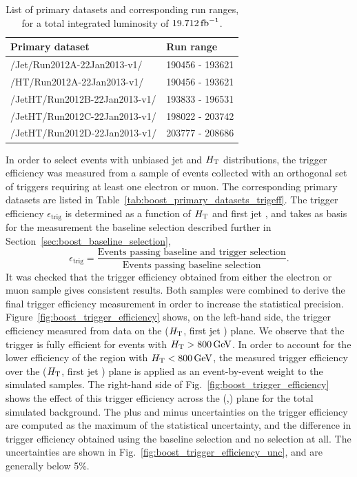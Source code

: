 \begin{table}[htdp]
\caption{List of primary datasets and corresponding run ranges, for a total integrated luminosity
of $19.712 \mbox{\ensuremath{\,\text{fb}^\text{$-$1}}}$.}
\begin{center}
\begin{tabular}{ l l }
\toprule
Primary dataset & Run range \\
\midrule
/Jet/Run2012A-22Jan2013-v1/ & 190456 - 193621 \\
/HT/Run2012A-22Jan2013-v1/  & 190456 - 193621 \\
/JetHT/Run2012B-22Jan2013-v1/ & 193833 - 196531 \\
/JetHT/Run2012C-22Jan2013-v1/ & 198022 - 203742 \\
/JetHT/Run2012D-22Jan2013-v1/ & 203777 - 208686  \\
\bottomrule
\end{tabular}
\end{center}
\label{tab:boost_primary_datasets}
\end{table}


In order to select events with unbiased jet \pt and $H_{\mathrm{T}}$ distributions,
the trigger efficiency was measured from a sample of events collected with an orthogonal set of
triggers requiring at least one electron or muon. The corresponding primary datasets are listed in
Table~\ref{tab:boost_primary_datasets_trigeff}. 
The trigger efficiency $\epsilon_\textrm{trig}$ is determined as a function of $H_{\mathrm{T}}$ and first jet
\pt, and takes as basis for the measurement the baseline selection described further in
Section~\ref{sec:boost_baseline_selection},
\begin{equation}
  \epsilon_\textrm{trig} = \frac{\textrm{Events passing baseline and trigger selection}}
{\textrm{Events passing baseline selection}}.
\end{equation}
It was checked that the trigger efficiency obtained from either the electron or muon sample gives 
consistent results. Both samples were combined to derive the final trigger efficiency measurement in 
order to increase the statistical precision.
Figure~\ref{fig:boost_trigger_efficiency} shows, on the left-hand side, the trigger efficiency
measured from data on the ($H_{\mathrm{T}}$, first jet \pt) plane.
We observe that the trigger is fully efficient for events with $H_{\mathrm{T}} > 800\,\text{Ge\hspace{-.08em}V}$.  
In order to account for the lower efficiency of the region with $H_{\mathrm{T}}  < 800\,\text{Ge\hspace{-.08em}V}$, the measured
trigger efficiency over the ($H_{\mathrm{T}}$, first jet \pt) plane is applied as an event-by-event weight
to the simulated samples. The right-hand side of Fig.~\ref{fig:boost_trigger_efficiency} shows the
effect of this trigger efficiency across the (\mr,\rsq) plane for the total simulated background. 
The plus and minus uncertainties on the trigger efficiency are computed as the maximum of the statistical 
uncertainty, and the difference in trigger efficiency obtained using the baseline selection and no 
selection at all. The uncertainties are shown in Fig.~\ref{fig:boost_trigger_efficiency_unc}, and are 
generally below 5\%.   

